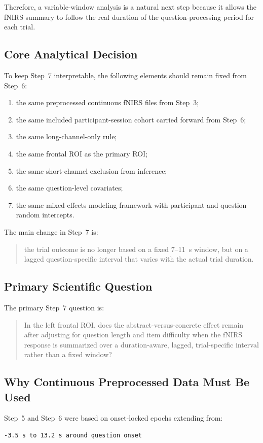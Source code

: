 \documentclass[11pt]{article}
\begin{document}
Therefore, a variable-window analysis is a natural next step because it allows the fNIRS summary
to follow the real duration of the question-processing period for each trial.

\subsection{Core Analytical Decision}
To keep Step~7 interpretable, the following elements should remain fixed from Step~6:
\begin{enumerate}
    \item the same preprocessed continuous fNIRS files from Step~3;
    \item the same included participant-session cohort carried forward from Step~6;
    \item the same long-channel-only rule;
    \item the same frontal ROI as the primary ROI;
    \item the same short-channel exclusion from inference;
    \item the same question-level covariates;
    \item the same mixed-effects modeling framework with participant and question random intercepts.
\end{enumerate}

The main change in Step~7 is:
\begin{quote}
the trial outcome is no longer based on a fixed 7--11~s window, but on a lagged
question-specific interval that varies with the actual trial duration.
\end{quote}

\subsection{Primary Scientific Question}
The primary Step~7 question is:
\begin{quote}
In the left frontal ROI, does the abstract-versus-concrete effect remain after adjusting for
question length and item difficulty when the fNIRS response is summarized over a duration-aware,
lagged, trial-specific interval rather than a fixed window?
\end{quote}

\subsection{Why Continuous Preprocessed Data Must Be Used}
Step~5 and Step~6 were based on onset-locked epochs extending from:
\begin{verbatim}
-3.5 s to 13.2 s around question onset
\end{verbatim}
\end{document}
